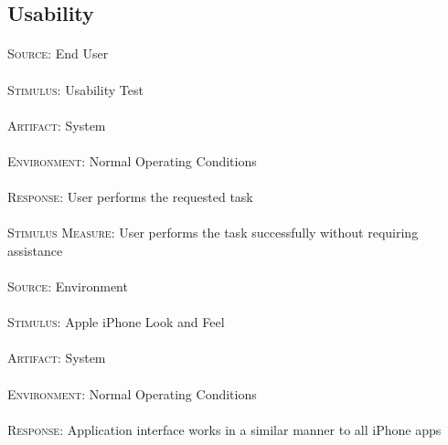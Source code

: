 \subsection{Usability}
\paragraph{}\textsc{Source:} End User
\paragraph{}\textsc{Stimulus:} Usability Test
\paragraph{}\textsc{Artifact:} System
\paragraph{}\textsc{Environment:} Normal Operating Conditions
\paragraph{}\textsc{Response:} User performs the requested task
\paragraph{}\textsc{Stimulus Measure:} User performs the task successfully without requiring assistance

\paragraph{}\textsc{Source:} Environment
\paragraph{}\textsc{Stimulus:} Apple iPhone Look and Feel
\paragraph{}\textsc{Artifact:} System
\paragraph{}\textsc{Environment:} Normal Operating Conditions
\paragraph{}\textsc{Response:} Application interface works in a similar manner to all iPhone apps
